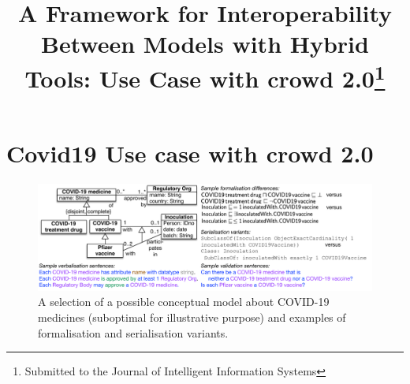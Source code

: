 \documentclass[sn-mathphys]{sn-jnl}
\newcommand{\crowdtwo}{{\sf crowd 2.0}\xspace}
\begin{document}
\title[A Framework for Interoperability Between Models with Hybrid Tools]{A Framework for Interoperability Between Models with Hybrid Tools: Use Case with \crowdtwo\footnote{Submitted to the Journal of Intelligent Information Systems}}


\author[1,2]{ }

\author[3,4]{ }

\author[5]{ }







\maketitle


\section{Covid19 Use case with \crowdtwo}
\label{sec:usecase}

\begin{figure}%
	\centering
		\includegraphics[width=\textwidth]{COVIDdrugsEx2.pdf}
	\caption{A selection of a possible conceptual model about COVID-19 medicines (suboptimal for illustrative purpose) and examples of formalisation and serialisation variants.}
	\label{fig:COVIDex}
\end{figure}
\end{document}
